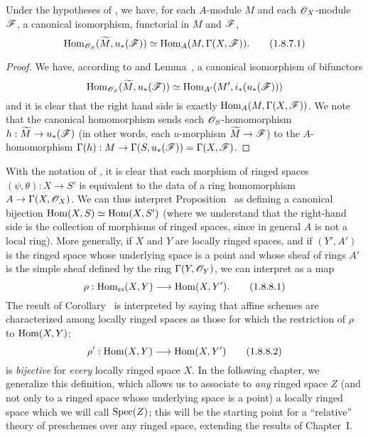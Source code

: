 \begin{corollary}[1.8.7]
\label{I.1.8.7}
Under the hypotheses of , we have, for each $A$-module $M$ and each $\mathscr{O}_X$-module $\mathscr{F}$, a canonical isomorphism, functorial in $M$ and $\mathscr{F}$,
\[
\label{I.1.8.7.1}
  \operatorname{Hom}_{\mathscr{O}_S}(\widetilde{M},u_*(\mathscr{F}))\simeq\operatorname{Hom}_A(M,\Gamma(X,\mathscr{F})).
  \tag{1.8.7.1}
\]
\end{corollary}

\begin{proof}
\label{proof-I.1.8.7}
We have, according to  and Lemma~, a canonical
isomorphism of bifunctors
\[
  \operatorname{Hom}_{\mathscr{O}_S}(\widetilde{M},u_*(\mathscr{F}))\simeq\operatorname{Hom}_{A'}(M',i_*(u_*(\mathscr{F})))
\]
and it is clear that the right hand side is exactly $\operatorname{Hom}_A(M,\Gamma(X,\mathscr{F}))$.
We note that the canonical homomorphism  sends each $\mathscr{O}_S$-homomorphism $h:\widetilde{M}\to u_*(\sh{F})$ (in other words, each $u$-morphism $\widetilde{M}\to\sh{F}$) to the $A$-homomorphism $\Gamma(h):M\to\Gamma(S,u_*(\sh{F}))=\Gamma(X,\sh{F})$.
\end{proof}

\begin{env}[1.8.8]
\label{I.1.8.8}
With the notation of , it is clear  that each morphism of ringed spaces $(\psi,\theta):X\to S'$ is equivalent to the data of a ring homomorphism $A\to\Gamma(X,\sh{O}_X)$.
We can thus interpret Proposition~ as defining a canonical bijection $\operatorname{Hom}(X,S)\simeq\operatorname{Hom}(X,S')$ (where we understand that the right-hand side is the collection of morphisms of ringed spaces, since in general $A$ is not a local ring).
More generally, if $X$ and $Y$ are locally ringed spaces, and if $(Y',A')$ is the ringed space whose underlying space is a point and whose sheaf of rings $A'$ is the simple sheaf defined by the ring $\Gamma(Y,\mathscr{O}_Y)$, we can interpret  as a map
\[
  \label{I.1.8.8.1}
  \rho:\Hom_\text{rs}(X,Y)\to\Hom(X,Y').
  \tag{1.8.8.1}
\]
The result of Corollary~ is interpreted by saying that affine schemes are characterized among locally ringed spaces as those for which the restriction of $\rho$ to
$\operatorname{Hom}(X,Y)$:
\[
  \label{I.1.8.8.2}
  \rho':\Hom(X,Y)\to\Hom(X,Y')
  \tag{1.8.8.2}
\]
is \emph{bijective} for \emph{every} locally ringed space $X$.
In the following chapter, we generalize this definition, which allows us to associate to \emph{any} ringed space $Z$ (and not only to a ringed space whose underlying space is a point) a locally ringed space which we will call $\operatorname{Spec}(Z)$;
this will be the starting point for a ``relative'' theory of preschemes over any ringed space, extending the results of Chapter~I.
\end{env}

